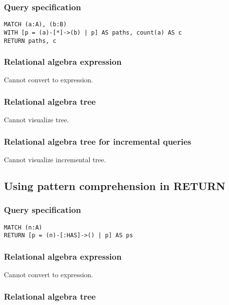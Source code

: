 \subsubsection*{Query specification}

\begin{lstlisting}
MATCH (a:A), (b:B)
WITH [p = (a)-[*]->(b) | p] AS paths, count(a) AS c
RETURN paths, c
\end{lstlisting}

\subsubsection*{Relational algebra expression}

Cannot convert to expression.

\subsubsection*{Relational algebra tree}

Cannot visualize tree.

\subsubsection*{Relational algebra tree for incremental queries}

Cannot visualize incremental tree.

\subsection{Using pattern comprehension in RETURN}

\subsubsection*{Query specification}

\begin{lstlisting}
MATCH (n:A)
RETURN [p = (n)-[:HAS]->() | p] AS ps
\end{lstlisting}

\subsubsection*{Relational algebra expression}

Cannot convert to expression.

\subsubsection*{Relational algebra tree}

